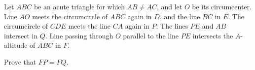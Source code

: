 Let $ABC$ be an acute triangle for which $AB \neq AC$,  and let $O$ be its circumcenter. Line $AO$ meets the circumcircle of $ABC$ again in $D$,  and the line $BC$ in $E$. The circumcircle of $CDE$ meets the line $CA$ again in $P$. The lines $PE$ and $AB$ intersect in $Q$. Line passing through $O$ parallel to the line $PE$ intersects the $A$-altitude of $ABC$ in $F$.

Prove that $FP = FQ$.